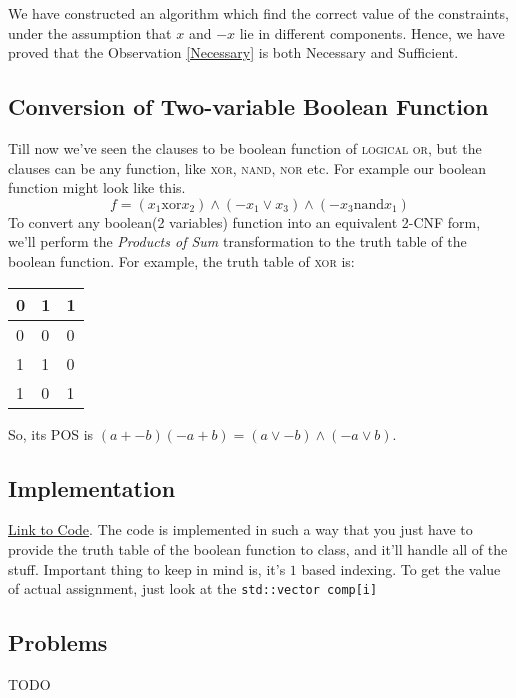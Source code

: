 \documentclass{article}
\theoremstyle{definition}
\begin{document}
We have constructed an algorithm which find the correct value of the constraints,
under the assumption that $x$ and $-x$ lie in different components. Hence, we have proved that the Observation \ref{Necessary}
is both Necessary and Sufficient.

\subsection{Conversion of Two-variable Boolean Function}
Till now we've seen the clauses to be boolean function of \textsc{logical or}, but the
clauses can be any function, like \textsc{xor, nand, nor} etc. For example our boolean function
might look like this.
\[
    f = (x_1 \text{xor} x_2) \land (-x_1 \lor x_3) \land (-x_3 \text{nand} x_1)
\]
To convert any boolean(2 variables) function into an equivalent 2-CNF form, we'll perform the
\textit{Products of Sum} transformation to the truth table of the boolean function. For example, the
truth table of \textsc{xor} is:

\begin{center}
\begin{table}[htb]
\begin{tabular}{|l|l|l|}
\hline
0 & 1 & 1 \\ \hline
0 & 0 & 0 \\ \hline
1 & 1 & 0 \\ \hline
1 & 0 & 1 \\ \hline
\end{tabular}
\end{table}
\end{center}

So, its POS is $(a + -b)(-a + b) = (a \lor -b) \land (-a \lor b)$.

\subsection{Implementation}
\href{https://github.com/Equlnox/IITP-ACM-Notebook/blob/master/code/graphs/2sat.cpp}{Link to Code}. The code
is implemented in such a way that you just have to provide the truth table of the boolean function to class, and it'll handle all of the stuff.
Important thing to keep in mind is, it's $1$ based indexing. To get the value of actual assignment,
just look at the \texttt{std::vector comp[i]}

\subsection{Problems}
TODO
\end{document}
